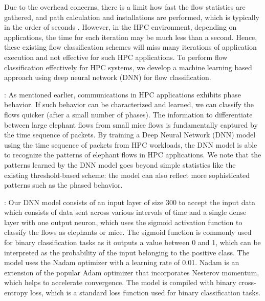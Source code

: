 Due to the overhead concerns, there is a limit how fast the flow statistics
are gathered, and path calculation and installations are performed, which is typically
in the order of seconds \cite{al2010hedera}.
However, in the HPC environment, depending
on applications, the time for each iteration may be much less than a second.
Hence, these existing flow classification schemes will miss many iterations
of application execution and not effective for such HPC applications.
To perform flow classification effectively for HPC systems, we develop
a machine learning based approach using deep neural network (DNN)
for flow classification.

\vspace{0.08in}
:
As mentioned earlier, communications in HPC applications exhibits phase
behavior. If such behavior can be characterized and learned, we can classify
the flows quicker (after a small number of phases).
The information to differentiate between large elephant flows from
small mice flows is fundamentally captured by the time sequence of packets.
By training a Deep Neural Network (DNN) model using the time sequence of
packets from HPC workloads, the DNN model is able to recognize the
patterns of elephant flows in HPC applications. We note that the patterns
learned by the DNN model goes beyond simple statistics like
the existing threshold-based scheme: the model can also reflect more
sophisticated patterns such as the phased behavior. 


\vspace{0.08in}
:
Our DNN model consists of an input layer of size 300 to accept the input data
which consists of data sent across various intervals of time and a single dense layer with
one output neuron, which uses the sigmoid activation function to classify the flows as elephants or mice.
The sigmoid function is commonly used for binary classification tasks
as it outputs a value between 0 and 1, which can be 
interpreted as the probability of the input belonging to the positive class. 
The model uses the Nadam optimizer with a learning rate of 0.01. Nadam is an 
extension of the popular Adam optimizer that incorporates Nesterov momentum, 
which helps to accelerate convergence. The model is compiled with binary 
cross-entropy loss, which is a standard loss function used for binary 
classification tasks.

